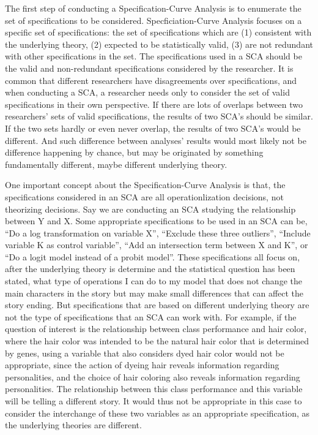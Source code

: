 \documentclass[12pt,twoside]{reedthesis}
\begin{document}
  The first step of conducting a Specification-Curve Analysis is to
  enumerate the set of specifications to be considered.
  Specficiation-Curve Analysis focuses on a specific set of
  specifications: the set of specifications which are (1) consistent with
  the underlying theory, (2) expected to be statistically valid, (3) are
  not redundant with other specifications in the set. The specifications
  used in a SCA should be the valid and non-redundant specifications
  considered by the researcher. It is common that different researchers
  have disagreements over specifications, and when conducting a SCA, a
  researcher needs only to consider the set of valid specifications in
  their own perspective. If there are lots of overlaps between two
  researchers' sets of valid specifications, the results of two SCA's
  should be similar. If the two sets hardly or even never overlap, the
  results of two SCA's would be different. And such difference between
  analyses' results would most likely not be difference happening by
  chance, but may be originated by something fundamentally different,
  maybe different underlying theory.
  
  \par 
  
  One important concept about the Specification-Curve Analysis is that,
  the specifications considered in an SCA are all operationlization
  decisions, not theorizing decisions. Say we are conducting an SCA
  studying the relationship between Y and X. Some appropriate
  specifications to be used in an SCA can be, ``Do a log transformation on
  variable X'', ``Exclude these three outliers'', ``Include variable K as
  control variable'', ``Add an intersection term between X and K'', or
  ``Do a logit model instead of a probit model''. These specifications all
  focus on, after the underlying theory is determine and the statistical
  question has been stated, what type of operations I can do to my model
  that does not change the main characters in the story but may make small
  differences that can affect the story ending. But specifications that
  are based on different underlying theory are not the type of
  specifications that an SCA can work with. For example, if the question
  of interest is the relationship between class performance and hair
  color, where the hair color was intended to be the natural hair color
  that is determined by genes, using a variable that also considers dyed
  hair color would not be appropriate, since the action of dyeing hair
  reveals information regarding personalities, and the choice of hair
  coloring also reveals information regarding personalities. The
  relationship between this class performance and this variable will be
  telling a different story. It would thus not be appropriate in this case
  to consider the interchange of these two variables as an appropriate
  specification, as the underlying theories are different.
  
\end{document}
